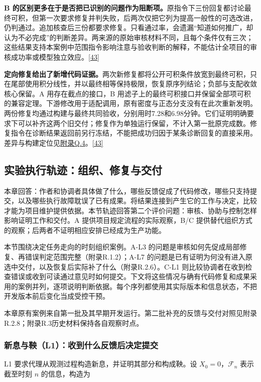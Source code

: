\textbf{B 的区别更多在于是否把已识别的问题作为阻断项。}原指令下三份回复都讨论最终可积，但第一次要求修复并判失败，后两次仅把它列为提高一般性的可选改进，仍判通过。追加核查后三份都要求修复。只看通过率，会遗漏“知道如何推广，却认为不必完成”的判断差异。两来源的原始审核材料不同，且每个条件仅有三次；这些结果支持本案例中范围指令影响注意与验收判断的解释，不能估计全项目的审核成功率或模型独立效应。\href{zh.pdf\#ref-43}{\mbox{[43]}}

\textbf{定向修复给出了新增代码证据。}两次新修复都将公开可积条件放宽到最终可积，只在尾部使用积分线性，并以最终相等保持极限，恢复原序列结论；负部与支配收敛核心保留。A 用存在截点的接口，B 用滤子上的最终可积接口并保留全部项可积的兼容定理。下游修改用于适配调用，原有密度与正态分支没有在此次重新发明。两份修复均通过构建与最终共同验收，分别用时7.28和6.98分钟。它们证明明确要求下可以补齐这两个旧交付；修复作为单独运行保留，不计入第一批原完成数。修复指令在诊断结果返回前另行冻结，不能把成功归因于某条诊断回复的直接采用。差异与构建定位见\href{zh-appendix.pdf\#q4}{附录Q.4}。\href{zh.pdf\#ref-43}{\mbox{[43]}}

\subsection[实验执行轨迹：组织、修复与交付]{\texorpdfstring{\protect\hypertarget{r2}{}实验执行轨迹：组织、修复与交付}{实验执行轨迹：组织、修复与交付}}
本章回答：作者和协调者具体做了什么，哪些反馈促成了代码修改，哪些只支持提交，以及哪些执行故障耽误了已有成果。将结果连接到产生它的工作与决定，比较才能为项目维护提供依据。本节轨迹回答第二个评价问题：审核、协助与控制怎样影响证明工作和交付。A 提供项目规定流程的实际观察，B/C 提供替代组织方式的观察；后两者不证明相应安排已经成为生产功能。

本节围绕决定任务走向的时刻组织案例。A-L3 的问题是审核如何先促成局部修复、再错误判定范围完整（附录R.1.2）；A-L7 的问题是已有证明为何没有进入原选中交付，以及恢复后实际补了什么（附录R.2.6）。C-L1 则比较协调者在收到检查错误或收到可读通过意见时如何提交。下文将这些情况与确有代码修复和成果采用的案例并列，逐项说明判断依据。每个序列都使用其实际版本和信息状态，不把开发版本前后变化当成受控干预。

本章原有案例来自第一批及其早期开发运行。第二批补充的反馈与交付对照见附录R.2.8；附录R.3历史材料保持各自观察时点。

\subsubsection[新息与鞅（L1）：收到什么反馈后决定提交]{\texorpdfstring{\protect\hypertarget{r2-1}{}新息与鞅（L1）：收到什么反馈后决定提交}{新息与鞅（L1）：收到什么反馈后决定提交}}
L1 要求代理从观测过程构造新息，并证明其部分和构成鞅。设 $X_0=0$，$\mathcal F_n$ 表示截至时刻 $n$ 的信息，构造为

